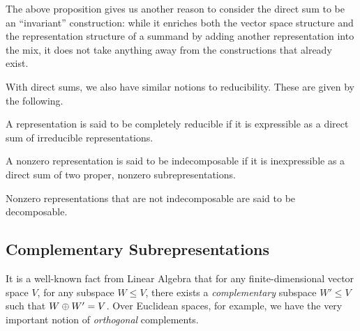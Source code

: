 The above proposition gives us another reason to consider the direct sum to be an ``invariant'' construction: while it enriches both the vector space structure and the representation structure of a summand by adding another representation into the mix, it does not take anything away from the constructions that already exist.

With direct sums, we also have similar notions to reducibility. These are given by the following.

\begin{boxdefinition} \label{Ch1:Def:Comp_Red}
    A representation is said to be completely reducible if it is expressible as a direct sum of irreducible representations.
\end{boxdefinition}

\begin{boxdefinition}[Indecomposability]
    A nonzero representation is said to be indecomposable if it is inexpressible as a direct sum of two proper, nonzero subrepresentations.
\end{boxdefinition}
Nonzero representations that are not indecomposable are said to be decomposable.

\subsection{Complementary Subrepresentations}

It is a well-known fact from Linear Algebra that for any finite-dimensional vector space $V$, for any subspace $W \leq V$, there exists a \textit{complementary} subspace $W' \leq V$ such that $W \oplus W' = V$. Over Euclidean spaces, for example, we have the very important notion of \textit{orthogonal} complements.


